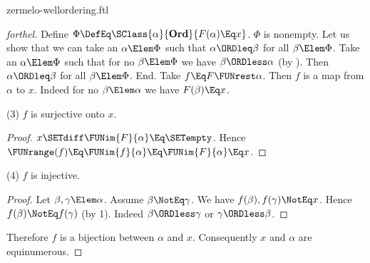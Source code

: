 \documentclass{stex}
\newcommand\Ord{\textbf{Ord}}
\begin{document}
\begin{smodule}{zermelo-wellordering.ftl}
\begin{proof}[forthel]
  Define $\Phi \DefEq \SClass{\alpha}{\Ord}{F(\alpha) \Eq x}$.
  $\Phi$ is nonempty.
  Let us show that we can take an $\alpha \Elem \Phi$ such that $\alpha \ORDleq \beta$ for all $\beta \Elem \Phi$.
    Take an $\alpha \Elem \Phi$ such that for no $\beta \Elem \Phi$ we have $\beta \ORDless \alpha$ (by ).
    Then $\alpha \ORDleq \beta$ for all $\beta \Elem \Phi$.
  End.
  Take $f \Eq F \FUNrest \alpha$.
  Then $f$ is a map from $\alpha$ to $x$.
  Indeed for no $\beta \Elem \alpha$ we have $F(\beta) \Eq x$.

  (3) $f$ is surjective onto $x$.
  \begin{proof}
    $x \SETdiff \FUNim{F}{\alpha} \Eq \SETempty$.
    Hence $\FUNrange(f)
      \Eq \FUNim{f}{\alpha}
      \Eq \FUNim{F}{\alpha}
      \Eq x$.
  \end{proof}

  (4) $f$ is injective.
  \begin{proof}
    Let $\beta, \gamma \Elem \alpha$.
    Assume $\beta \NotEq \gamma$.
    We have $f(\beta), f(\gamma) \NotEq x$.
    Hence $f(\beta) \NotEq f(\gamma)$ (by 1).
    Indeed $\beta \ORDless \gamma$ or $\gamma \ORDless \beta$.
  \end{proof}

  Therefore $f$ is a bijection between $\alpha$ and $x$.
  Consequently $x$ and $\alpha$ are equinumerous.
\end{proof}

\printbibliography
{}
\end{smodule}
\end{document}
